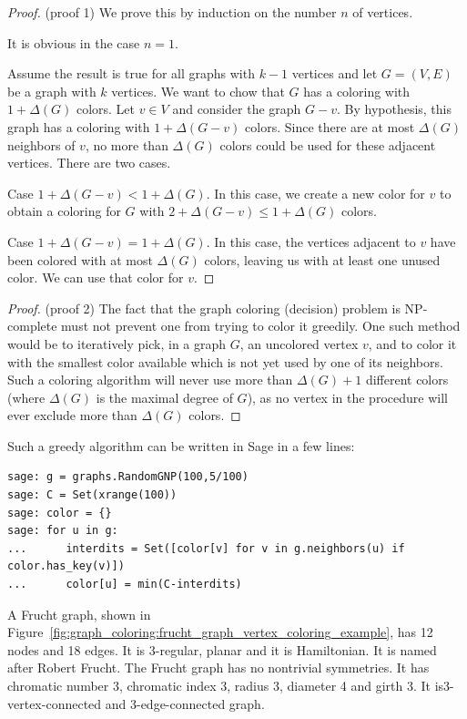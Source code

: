 \begin{proof}
(proof 1)
We prove this by induction on the number $n$ of vertices.

It is obvious in the case $n=1$.

Assume the result is true for all graphs with $k-1$ vertices and let
$G=(V,E)$ be a graph with $k$ vertices. We want to chow that $G$ has a
coloring with $1+\Delta(G)$ colors. Let $v\in V$ and consider the
graph $G-v$. By hypothesis, this graph has a coloring with
$1+\Delta(G-v)$ colors. Since there are at most $\Delta(G)$
neighbors of $v$, no more than $\Delta(G)$ colors could be used for
these adjacent vertices. There are two cases.

Case $1+\Delta(G-v) < 1+\Delta(G)$. In this case, we create a new
color for $v$ to obtain a coloring for $G$ with
$2+\Delta(G-v) \leq 1+\Delta(G)$ colors.

Case $1+\Delta(G-v) = 1+\Delta(G)$. In this case, the vertices adjacent to
$v$ have been colored with at most $\Delta(G)$ colors, leaving us with
at least one unused color. We can use that color for $v$.
\end{proof}

\begin{proof}
(proof 2)
The fact that the graph coloring (decision) problem
is NP-complete must not prevent one from trying to
color it greedily. One such
method would be to iteratively pick, in a graph $G$, an uncolored
vertex $v$, and to color it with the smallest color available which
is not yet used by one of its neighbors.
Such a coloring algorithm will never
use more than $\Delta(G)+1$ different
colors (where $\Delta(G)$ is the maximal degree of $G$), as
no vertex in the procedure will ever exclude more than
$\Delta(G)$ colors.
\end{proof}

Such a greedy algorithm can be written in Sage in a few lines:

\begin{lstlisting}
sage: g = graphs.RandomGNP(100,5/100)
sage: C = Set(xrange(100))
sage: color = {}
sage: for u in g:
...      interdits = Set([color[v] for v in g.neighbors(u) if color.has_key(v)])
...      color[u] = min(C-interdits)
\end{lstlisting}


\begin{example}
\label{eg:graph_coloring:frucht_graph_vertex_coloring_example}
A Frucht graph,
shown in Figure~\ref{fig:graph_coloring:frucht_graph_vertex_coloring_example},
has 12 nodes and 18 edges. It is $3$-regular,
planar and it is Hamiltonian. It is named after Robert Frucht.
The Frucht graph has no nontrivial symmetries.
It has chromatic number 3, chromatic index 3, radius 3, diameter 4 and
girth 3.
It is3-vertex-connected and 3-edge-connected graph.
\end{example}

